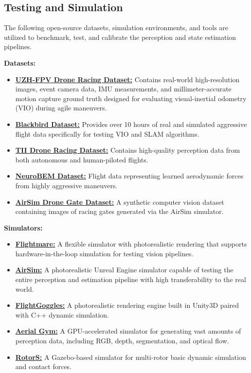 \documentclass{article}
\begin{document}
\subsection{Testing and Simulation}
The following open-source datasets, simulation environments, and tools are utilized to benchmark, test, and calibrate the perception and state estimation pipelines.

\textbf{Datasets:}
\begin{itemize}
    \item \href{https://fpv.ifi.uzh.ch/}{\textbf{UZH-FPV Drone Racing Dataset:}} Contains real-world high-resolution images, event camera data, IMU measurements, and millimeter-accurate motion capture ground truth designed for evaluating visual-inertial odometry (VIO) during agile maneuvers.
    \item \href{https://github.com/mit-aera/Blackbird-Dataset}{\textbf{Blackbird Dataset:}} Provides over 10 hours of real and simulated aggressive flight data specifically for testing VIO and SLAM algorithms.
    \item \href{https://github.com/tii-racing/drone-racing-dataset}{\textbf{TII Drone Racing Dataset:}} Contains high-quality perception data from both autonomous and human-piloted flights.
    \item \href{https://rpg.ifi.uzh.ch/NeuroBEM.html}{\textbf{NeuroBEM Dataset:}} Flight data representing learned aerodynamic forces from highly aggressive maneuvers.
    \item \href{https://universe.roboflow.com/airsim-gate/airsim-drone-gate}{\textbf{AirSim Drone Gate Dataset:}} A synthetic computer vision dataset containing images of racing gates generated via the AirSim simulator.
\end{itemize}

\textbf{Simulators:}
\begin{itemize}
    \item \href{https://uzh-rpg.github.io/flightmare/}{\textbf{Flightmare:}} A flexible simulator with photorealistic rendering that supports hardware-in-the-loop simulation for testing vision pipelines.
    \item \href{https://microsoft.github.io/AirSim/}{\textbf{AirSim:}} A photorealistic Unreal Engine simulator capable of testing the entire perception and estimation pipeline with high transferability to the real world.
    \item \href{https://github.com/mit-aera/FlightGoggles}{\textbf{FlightGoggles:}} A photorealistic rendering engine built in Unity3D paired with C++ dynamic simulation.
    \item \href{https://github.com/ntnu-arl/aerial_gym_simulator}{\textbf{Aerial Gym:}} A GPU-accelerated simulator for generating vast amounts of perception data, including RGB, depth, segmentation, and optical flow.
    \item \href{https://github.com/ethz-asl/rotors_simulator}{\textbf{RotorS:}} A Gazebo-based simulator for multi-rotor basic dynamic simulation and contact forces.
\end{itemize}
\end{document}
